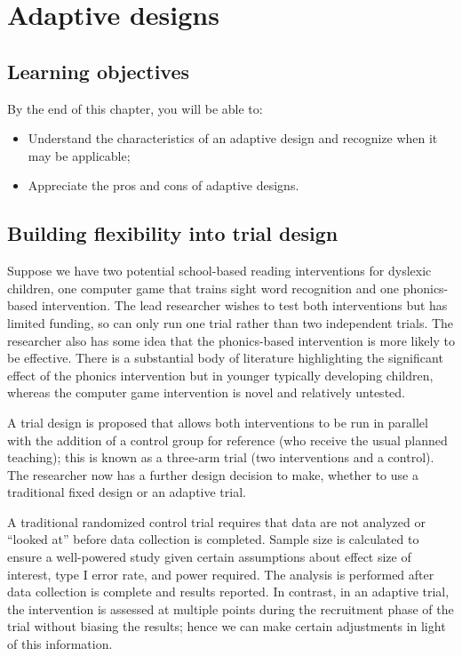 \documentclass{krantz}
\providecommand{\tightlist}{%
\setlength{\itemsep}{0pt}\setlength{\parskip}{0pt}}
\begin{document}
\hypertarget{adaptive}{%
\chapter{Adaptive designs}\label{adaptive}}

\hypertarget{learning-objectives-15}{%
\section{Learning objectives}\label{learning-objectives-15}}

By the end of this chapter, you will be able to:

\begin{itemize}
\tightlist
\item
  Understand the characteristics of an adaptive design and recognize when it may be applicable;
\item
  Appreciate the pros and cons of adaptive designs.
\end{itemize}

\hypertarget{building-flexibility-into-trial-design}{%
\section{Building flexibility into trial design}\label{building-flexibility-into-trial-design}}

Suppose we have two potential school-based reading interventions for dyslexic children, one computer game that trains sight word recognition and one phonics-based intervention. The lead researcher wishes to test both interventions but has limited funding, so can only run one trial rather than two independent trials. The researcher also has some idea that the phonics-based intervention is more likely to be effective. There is a substantial body of literature highlighting the significant effect of the phonics intervention but in younger typically developing children, whereas the computer game intervention is novel and relatively untested.

A trial design is proposed that allows both interventions to be run in parallel with the addition of a control group for reference (who receive the usual planned teaching); this is known as a three-arm trial (two interventions and a control). The researcher now has a further design decision to make, whether to use a traditional fixed design or an adaptive trial.

A traditional randomized control trial requires that data are not analyzed or ``looked at'' before data collection is completed. Sample size is calculated to ensure a well-powered study given certain assumptions about effect size of interest, type I error rate, and power required. The analysis is performed after data collection is complete and results reported. In contrast, in an adaptive trial, the intervention is assessed at multiple points during the recruitment phase of the trial without biasing the results; hence we can make certain adjustments in light of this information.
\end{document}
